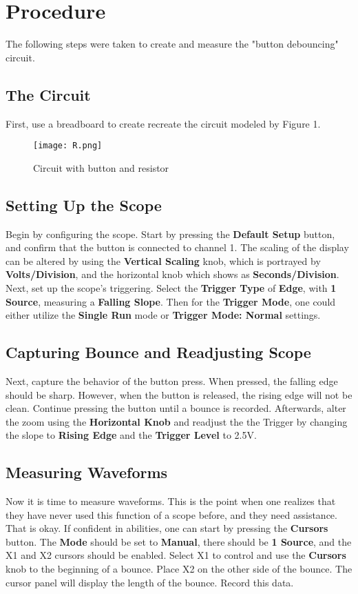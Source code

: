 \documentclass{hitec}
\begin{document}
	\section{Procedure}
	The following steps were taken to create and measure the "button debouncing" circuit.
	\subsection{The Circuit}
	First, use a breadboard to create recreate the circuit modeled by Figure 1. 
	\begin{figure}[h]
		\texttt{[image: R.png]}
		\caption{Circuit with button and resistor}
		\label{fig:ResistorCircuit}
	\end{figure}
	\subsection{Setting Up the Scope}
	Begin by configuring the scope. Start by pressing the \textbf{Default Setup} button, and confirm that the button is connected to channel 1. The scaling of the display can be altered by using the \textbf{Vertical Scaling} knob, which is portrayed by \textbf{Volts/Division}, and the horizontal knob which shows as \textbf{Seconds/Division}. Next, set up the scope's triggering. Select the \textbf{Trigger Type} of \textbf{Edge}, with \textbf{1 Source}, measuring a \textbf{Falling Slope}. Then for the \textbf{Trigger Mode}, one could either utilize the \textbf{Single Run} mode or \textbf{Trigger Mode: Normal} settings. 
	
	\subsection{Capturing Bounce and Readjusting Scope}
	Next, capture the behavior of the button press. When pressed, the falling edge should be sharp. However, when the button is released, the rising edge will not be clean. Continue pressing the button until a bounce is recorded. Afterwards, alter the zoom using the \textbf{Horizontal Knob} and readjust the the Trigger by changing the slope to \textbf{Rising Edge} and the \textbf{Trigger Level} to 2.5V. 
	\\
	\subsection{Measuring Waveforms}
	Now it is time to measure waveforms. This is the point when one realizes that they have never used this function of a scope before, and they need assistance. That is okay. If confident in abilities, one can start by pressing the \textbf{Cursors} button. The \textbf{Mode} should be set to \textbf{Manual}, there should be \textbf{1 Source}, and the X1 and X2 cursors should be enabled. Select X1 to control and use the \textbf{Cursors} knob to the beginning of a bounce. Place X2 on the other side of the bounce. The cursor panel will display the length of the bounce. Record this data. 
	
\end{document}

